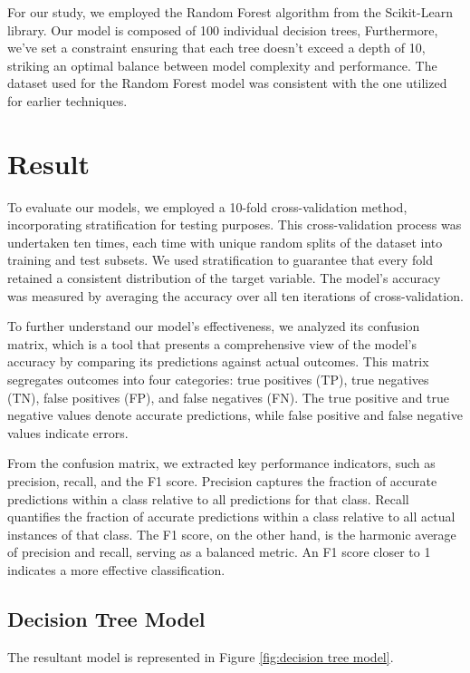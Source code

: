 For our study, we employed the Random Forest algorithm from the Scikit-Learn library. Our model is composed of 100 individual decision trees, Furthermore, we've set a constraint ensuring that each tree doesn't exceed a depth of 10, striking an optimal balance between model complexity and performance.
The dataset used for the Random Forest model was consistent with the one utilized for earlier techniques.

\section{Result}
\label{sec:result}

To evaluate our models, we employed a 10-fold cross-validation method, incorporating stratification for testing purposes. This cross-validation process was undertaken ten times, each time with unique random splits of the dataset into training and test subsets. We used stratification to guarantee that every fold retained a consistent distribution of the target variable. The model's accuracy was measured by averaging the accuracy over all ten iterations of cross-validation.

To further understand our model's effectiveness, we analyzed its confusion matrix, which is a tool that presents a comprehensive view of the model's accuracy by comparing its predictions against actual outcomes. This matrix segregates outcomes into four categories: true positives (TP), true negatives (TN), false positives (FP), and false negatives (FN). The true positive and true negative values denote accurate predictions, while false positive and false negative values indicate errors.

From the confusion matrix, we extracted key performance indicators, such  as precision, recall, and the F1 score. Precision captures the fraction of accurate predictions within a class relative to all predictions for that class. Recall quantifies the fraction of accurate predictions within a class relative to all actual instances of that class. The F1 score, on the other hand, is the harmonic average of precision and recall, serving as a balanced metric. An F1 score closer to 1 indicates a more effective classification.

\subsection{Decision Tree Model}
\label{subsec:decision tree model}

The resultant model is represented in Figure \ref{fig:decision tree model}.

